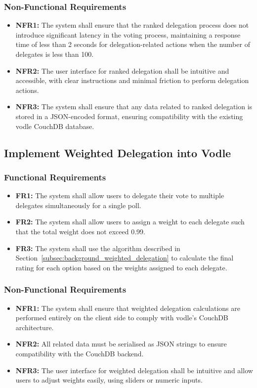 \subsubsection{Non-Functional Requirements}
\begin{itemize}
    \item \textbf{NFR1:} The system shall ensure that the ranked delegation process does not introduce significant latency in the voting process, maintaining a response time of less than 2 seconds for delegation-related actions when the number of delegates is less than 100.

    \item \textbf{NFR2:} The user interface for ranked delegation shall be intuitive and accessible, with clear instructions and minimal friction to perform delegation actions.
    
    \item \textbf{NFR3:} The system shall ensure that any data related to ranked delegation is stored in a JSON-encoded format, ensuring compatibility with the existing vodle CouchDB database.
\end{itemize}
\subsection{Implement Weighted Delegation into Vodle}
\subsubsection{Functional Requirements}
\begin{itemize}
    \item \textbf{FR1:} The system shall allow users to delegate their vote to multiple delegates simultaneously for a single poll.

    \item \textbf{FR2:} The system shall allow users to assign a weight to each delegate such that the total weight does not exceed 0.99.

    \item \textbf{FR3:} The system shall use the algorithm described in Section~\ref{subsec:background_weighted_delegation} to calculate the final rating for each option based on the weights assigned to each delegate.
\end{itemize}

\subsubsection{Non-Functional Requirements}
\begin{itemize}
    \item \textbf{NFR1:} The system shall ensure that weighted delegation calculations are performed entirely on the client side to comply with vodle's CouchDB architecture.

    \item \textbf{NFR2:} All related data must be serialised as JSON strings to ensure compatibility with the CouchDB backend.

    \item \textbf{NFR3:} The user interface for weighted delegation shall be intuitive and allow users to adjust weights easily, using sliders or numeric inputs.
\end{itemize}
